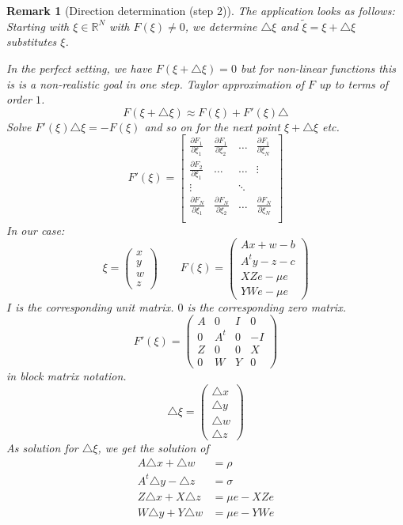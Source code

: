 \documentclass[a4paper]{article}
\numberwithin{lecref}{subsection}
\newtheorem*{Remark}{Remark}
\begin{document}
\begin{Remark}[Direction determination (step 2)]
	The application looks as follows:
	Starting with $\xi \in \mathbb R^N$ with $F(\xi) \neq 0$, we determine $\triangle \xi$ and $\tilde\xi = \xi + \triangle \xi$ substitutes $\xi$.

	In the perfect setting, we have $F(\xi + \triangle \xi) = 0$ but for non-linear functions this is is a non-realistic goal in one step.
	Taylor approximation of $F$ up to terms of order $1$.
	\[ F(\xi + \triangle \xi) \approx F(\xi) + F'(\xi) \triangle \]
	Solve $F'(\xi) \triangle \xi = -F(\xi)$ and so on for the next point $\xi + \triangle \xi$ etc.
	\[
		F'(\xi) = \begin{bmatrix}
			\frac{\partial F_1}{\partial \xi_1} & \frac{\partial F_1}{\partial \xi_2} & \dots & \frac{\partial F_1}{\partial \xi_N} \\
			\frac{\partial F_2}{\partial \xi_1} & \dots & \dots & \vdots \\
			\vdots &  & \ddots & \\
			\frac{\partial F_N}{\partial \xi_1} & \frac{\partial F_N}{\partial \xi_2} & \dots & \frac{\partial F_N}{\partial \xi_N} \\
		\end{bmatrix}
	\]
	In our case:
	\[ \xi = \begin{pmatrix} x \\ y \\ w \\ z \end{pmatrix} \qquad F(\xi) = \begin{pmatrix} Ax + w - b \\ A^t y - z - c \\ XZ e - \mu e \\ YW e - \mu e \end{pmatrix} \]
	$I$ is the corresponding unit matrix. $0$ is the corresponding zero matrix.
	\[ F'(\xi) = \begin{pmatrix} A & 0 & I & 0 \\ 0 & A^t & 0 & -I \\ Z & 0 & 0 & X \\ 0 & W & Y & 0 \end{pmatrix} \]
	in block matrix notation.
	\[ \triangle \xi = \begin{pmatrix} \triangle x \\ \triangle y \\ \triangle w \\ \triangle z \end{pmatrix} \]
	As solution for $\triangle \xi$, we get the solution of
	\begin{align*}
		A \triangle x + \triangle w &= \rho \\
		A^t \triangle y - \triangle z &= \sigma \\
		Z \triangle x + X \triangle z &= \mu e - XZe \\
		W \triangle y + Y \triangle w &= \mu e - YWe
	\end{align*}


\end{Remark}
\end{document}
